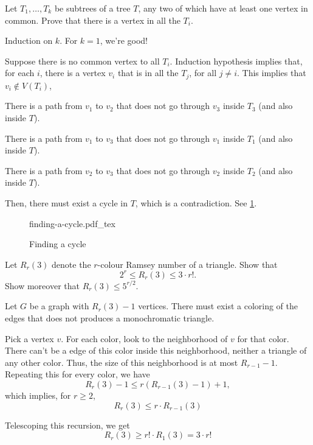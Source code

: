 \documentclass[10pt, a4paper]{article}
\newcommand{\incfig}[2][1]{%
    \def\svgwidth{#1\columnwidth}
    {#2.pdf_tex}
}
\begin{document}
\newpage
\begin{prob}
	Let $T_1, \dots, T_k$ be subtrees of a tree $T$, any two of which have at least one vertex in common. Prove that there is a vertex in all the $T_i$.
\end{prob}
\begin{sk}
	Induction on $k$. For $k = 1$, we're good!

	Suppose there is no common vertex to all $T_i$.
	Induction hypothesis implies that, for each $i$, there is a vertex $v_i$ that is in all the $T_j$, for all $j \neq i$.
	This implies that $v_i \not\in V(T_i)$,

	There is a path from $v_1$ to $v_2$ that does not go through $v_3$ inside $T_3$ (and also inside $T$).

	There is a path from $v_1$ to $v_3$ that does not go through $v_1$ inside $T_1$ (and also inside $T$).

	There is a path from $v_2$ to $v_3$ that does not go through $v_2$ inside $T_2$ (and also inside $T$).

	Then, there must exist a cycle in $T$, which is a contradiction. See \cref{fig:finding-a-cycle}.
\end{sk}

\begin{figure}[ht]
    \centering
	\incfig[0.5]{finding-a-cycle}
    \caption{Finding a cycle}
    \label{fig:finding-a-cycle}
\end{figure}

\newpage
\begin{prob}
	Let $R_r(3)$ denote the $r$-colour Ramsey number of a triangle. Show that \[
		2^r \leqslant R_r(3) \leqslant 3 \cdot r!.
	\]
	Show moreover that $R_r(3) \leqslant 5^{r/2}$.
\end{prob}

\begin{sol}

\end{sol}

\begin{sol}
	Let $G$ be a graph with $R_r(3) - 1$ vertices. There must exist a coloring of the edges that does not produces a monochromatic triangle.
	
	Pick a vertex $v$. For each color, look to the neighborhood of $v$ for that color. There can't be a edge of this color inside this neighborhood, neither a triangle of any other color. Thus, the size of this neighborhood is at most $R_{r-1}-1$. Repeating this for every color, we have  \[
		R_r(3) - 1 \le r(R_{r-1}(3) - 1) + 1,
	\]
	which implies, for $r \ge 2$, \[
		R_r(3) \le r \cdot R_{r-1}(3)
	\]

	Telescoping this recursion, we get \[
		R_r(3) \ge r! \cdot R_{1}(3) = 3\cdot r!
	\]
\end{sol}
\end{document}
